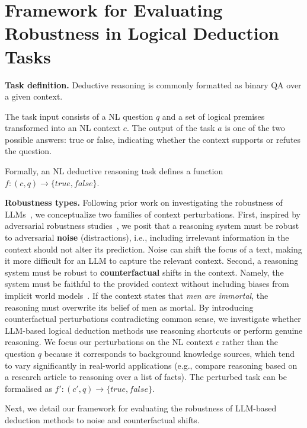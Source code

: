 \section{Framework for Evaluating Robustness in Logical Deduction Tasks}
\label{sec:robust}
\textbf{Task definition.} Deductive reasoning is commonly formatted as binary \ac{QA} over a given context. 

The task input consists of a \ac{NL} question $q$ and a set of logical premises transformed into an \ac{NL} context $c$. The output of the task $a$ is one of the two possible answers: true or false, indicating whether the context supports or refutes the question. %

Formally, an \ac{NL} deductive reasoning task defines a function $f: (c,q) \rightarrow \{true, false\}$. 

\noindent \textbf{Robustness types.} Following prior work on investigating the robustness of \ac{LLM}s~\cite{sarlin2020superglue,liu2023recall}, we conceptualize two families of context perturbations.
First, inspired by adversarial robustness studies~\cite{nakamura-etal-2023-logicattack}, we posit that a reasoning system must be robust to adversarial \textbf{noise} (distractions), i.e., including irrelevant information in the context should not alter its prediction. 
Noise can shift the focus of a text, making it more difficult for an \ac{LLM} to capture the relevant context.
Second, a reasoning system must be robust to \textbf{counterfactual} shifts in the context. Namely, the system must be faithful to the provided context without including biases from implicit world models~\cite{liu2023recall}. 
If the context states that \emph{men are immortal}, the reasoning must overwrite its belief of men as mortal. 
By introducing counterfactual perturbations contradicting common sense, we investigate whether \ac{LLM}-based logical deduction methods use reasoning shortcuts or perform genuine reasoning.
We focus our perturbations on the \ac{NL} context $c$ rather than the question $q$ because it corresponds to background knowledge sources, which tend to vary significantly in real-world applications (e.g., compare reasoning based on a research article to reasoning over a list of facts). The perturbed task can be formalised as $f': (c',q) \rightarrow \{true, false\}$. 

Next, we detail our framework for evaluating the robustness of \ac{LLM}-based deduction methods to noise and counterfactual shifts.

